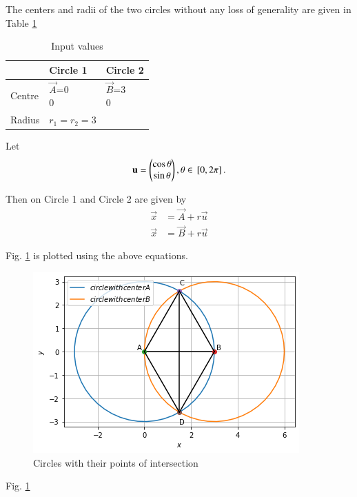 The centers and radii of the two circles without any loss of generality are given in Table \ref{constr/55/tab:table1}
%
\begin{table}[!ht]
\begin{center}
\begin{tabular}{ | m{2cm} | m{2cm} | m{2cm} |} 
\hline
 & Circle 1 & Circle 2 \\
\hline
Centre  & $\vec{A}$=\myvec{0\\0} & $\vec{B}$=\myvec{3\\0} \\ 
\hline
Radius & $r_{1}=r_{2}=3$  \\ 
\hline
\end{tabular}
\end{center}
\caption{Input values}
\label{constr/55/tab:table1}

\end{table}


Let 
\begin{align}
\mathbf{u}=\begin{pmatrix}\cos \theta\\  \sin \theta\end{pmatrix},  \theta \in {}\left[0,2\pi\right].
\end{align}

Then on Circle 1  and Circle 2 are  given by 
\begin{align}
\vec{x}&=\vec{A}+r\vec{u}
\\
\vec{x}&=\vec{B}+r\vec{u}
\end{align}

Fig. \ref{constr/55/fig:circle} is plotted using the above equations.
%
\begin{figure}[!ht]
\centering
\includegraphics[width=\columnwidth]{solutions/55/Figures/figure3.png}
\caption{Circles with their points of intersection}
\label{constr/55/fig:circle}	
\end{figure}
Fig. \ref{constr/55/fig:circle} 

